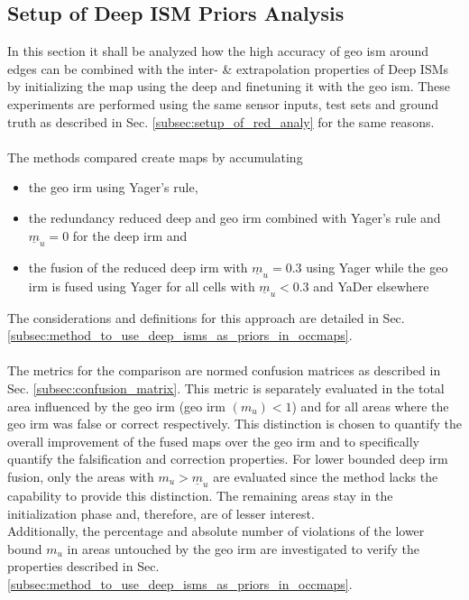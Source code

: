 \subsection{Setup of Deep ISM Priors Analysis}
\label{subsec:setup_of_prior_analy}
In this section it shall be analyzed how the high accuracy of geo \gls{ism} around edges can be combined with the inter- \& extrapolation properties of Deep ISMs by initializing the map using the deep and finetuning it with the geo \gls{ism}. These experiments are performed using the same sensor inputs, test sets and ground truth as described in Sec. \ref{subsec:setup_of_red_analy} for the same reasons. 
\\\\
The methods compared create maps by accumulating
\begin{itemize}[noitemsep,topsep=0pt,nolistsep]
	\item the geo \gls{irm} using Yager's rule,
	\item the redundancy reduced deep and geo \gls{irm} combined with Yager's rule and $\underline{m}_u = 0$ for the deep \gls{irm} and
	\item the fusion of the reduced deep \gls{irm} with $\underline{m}_u = 0.3$ using Yager while the geo \gls{irm} is fused using Yager for all cells with $\underline{m}_u < 0.3$ and YaDer elsewhere
\end{itemize}
The considerations and definitions for this approach are detailed in Sec. \ref{subsec:method_to_use_deep_isms_as_priors_in_occmaps}. 
\\\\
The metrics for the comparison are normed confusion matrices as described in Sec. \ref{subsec:confusion_matrix}. This metric is separately evaluated in the total area influenced by the geo \gls{irm} (geo \gls{irm} $(m_u) < 1$) and for all areas where the geo \gls{irm} was false or correct respectively. This distinction is chosen to quantify the overall improvement of the fused maps over the geo \gls{irm} and to specifically quantify the falsification and correction properties. For lower bounded deep \gls{irm} fusion, only the areas with $m_u > \underline{m}_u$ are evaluated since the method lacks the capability to provide this distinction. The remaining areas stay in the initialization phase and, therefore, are of lesser interest.\\
Additionally, the percentage and absolute number of violations of the lower bound $m_u$ in areas untouched by the geo \gls{irm} are investigated to verify the properties described in Sec. \ref{subsec:method_to_use_deep_isms_as_priors_in_occmaps}.
%
